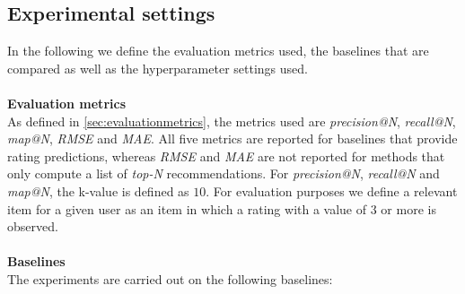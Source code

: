 \subsection{Experimental settings}
In the following we define the evaluation metrics used, the baselines that are compared as well as the hyperparameter settings used.
\\\\
\textbf{Evaluation metrics}\\
As defined in \autoref{sec:evaluationmetrics}, the metrics used are \textit{precision@N}, \textit{recall@N}, \textit{map@N}, \textit{RMSE} and \textit{MAE}.
All five metrics are reported for baselines that provide rating predictions, whereas \textit{RMSE} and \textit{MAE} are not reported for methods that only compute a list of \textit{top-N} recommendations.
For \textit{precision@N}, \textit{recall@N} and \textit{map@N}, the k-value is defined as $10$.
For evaluation purposes we define a relevant item for a given user as an item in which a rating with a value of $3$ or more is observed. 
\\\\
\textbf{Baselines}\\
The experiments are carried out on the following baselines:
